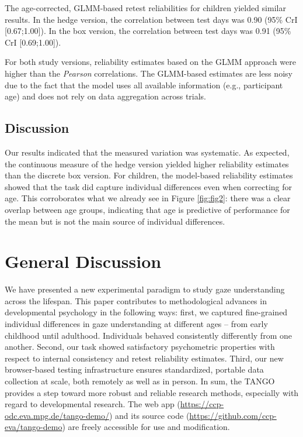 \documentclass[
  man,floatsintext]{apa6}
\begin{document}
The age-corrected, GLMM-based retest reliabilities for children yielded similar results.
In the hedge version, the correlation between test days was 0.90 (95\% CrI {[}0.67;1.00{]}).
In the box version, the correlation between test days was 0.91 (95\% CrI {[}0.69;1.00{]}).

For both study versions, reliability estimates based on the GLMM approach were higher than the \emph{Pearson} correlations.
The GLMM-based estimates are less noisy due to the fact that the model uses all available information (e.g., participant age) and does not rely on data aggregation across trials.

\hypertarget{discussion-1}{%
\subsection{Discussion}\label{discussion-1}}

Our results indicated that the measured variation was systematic.
As expected, the continuous measure of the hedge version yielded higher reliability estimates than the discrete box version.
For children, the model-based reliability estimates showed that the task did capture individual differences even when correcting for age.
This corroborates what we already see in Figure \ref{fig:fig2}: there was a clear overlap between age groups, indicating that age is predictive of performance for the mean but is not the main source of individual differences.

\hypertarget{general-discussion}{%
\section{General Discussion}\label{general-discussion}}

We have presented a new experimental paradigm to study gaze understanding across the lifespan.
This paper contributes to methodological advances in developmental psychology in the following ways: first, we captured fine-grained individual differences in gaze understanding at different ages -- from early childhood until adulthood.
Individuals behaved consistently differently from one another.
Second, our task showed satisfactory psychometric properties with respect to internal consistency and retest reliability estimates.
Third, our new browser-based testing infrastructure ensures standardized, portable data collection at scale, both remotely as well as in person.
In sum, the TANGO provides a step toward more robust and reliable research methods, especially with regard to developmental research.
The web app (\url{https://ccp-odc.eva.mpg.de/tango-demo/}) and its source code (\url{https://github.com/ccp-eva/tango-demo}) are freely accessible for use and modification.
\end{document}
